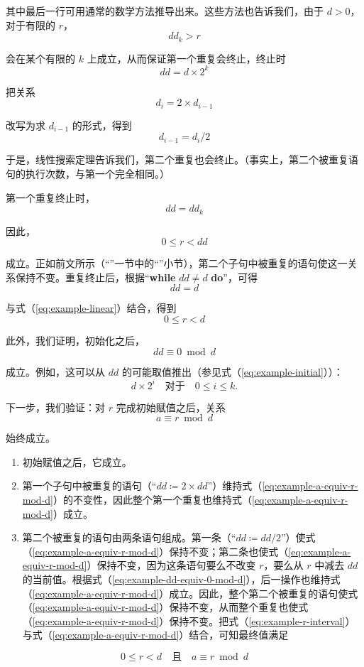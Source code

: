 \noindent
其中最后一行可用通常的数学方法推导出来。这些方法也告诉我们，由于 $d > 0$，对于有限的 $r$，
$$
dd_k > r
$$

\noindent
会在某个有限的 $k$ 上成立，从而保证第一个重复会终止，终止时
$$
dd = d\times 2^k
$$

把关系
$$
d_i = 2\times d_{i-1}
$$

\noindent
改写为求 $d_{i-1}$ 的形式，得到
$$
d_{i-1} = d_i/2
$$

\noindent
于是，线性搜索定理告诉我们，第二个重复也会终止。（事实上，第二个被重复语句的执行次数，与第一个完全相同。）

第一个重复终止时，
$$
dd=dd_k
$$

\noindent
因此，
\begin{equation}
	\label{eq:example-linear}
	0 \leqslant r <dd
\end{equation}

\noindent
成立。正如前文所示（“”一节中的“”小节），第二个子句中被重复的语句使这一关系保持不变。重复终止后，根据“\textbf{while} $dd \neq d$ \textbf{do}”，可得
$$
dd = d
$$

\noindent
与式（\ref{eq:example-linear}）结合，得到
\begin{equation}
	\label{eq:example-r-interval}
	0 \leqslant r < d
\end{equation}

此外，我们证明，初始化之后，
\begin{equation}
	\label{eq:example-dd-equiv-0-mod-d}
	dd \equiv 0 \bmod d
\end{equation}

\noindent
成立。例如，这可以从 $dd$ 的可能取值推出（参见式（\ref{eq:example-initial}））：
$$
d\times 2^i\quad \text{对于}\quad 0 \leqslant i \leqslant k.
$$

下一步，我们验证：对 $r$ 完成初始赋值之后，关系
\begin{equation}
	\label{eq:example-a-equiv-r-mod-d}
	a \equiv r \bmod d
\end{equation}

\noindent
始终成立。

\begin{enumerate}[wide, nosep, label=(\arabic*)]
	\item 初始赋值之后，它成立。
	\item 第一个子句中被重复的语句（“$dd \coloneq 2\times dd$”）维持式（\ref{eq:example-a-equiv-r-mod-d}）的不变性，因此整个第一个重复也维持式（\ref{eq:example-a-equiv-r-mod-d}）成立。
	\item 第二个被重复的语句由两条语句组成。第一条（“$dd \coloneq dd/2$”）使式（\ref{eq:example-a-equiv-r-mod-d}）保持不变；第二条也使式（\ref{eq:example-a-equiv-r-mod-d}）保持不变，因为这条语句要么不改变 $r$，要么从 $r$ 中减去 $dd$ 的当前值。根据式（\ref{eq:example-dd-equiv-0-mod-d}），后一操作也维持式（\ref{eq:example-a-equiv-r-mod-d}）成立。因此，整个第二个被重复的语句使式（\ref{eq:example-a-equiv-r-mod-d}）保持不变，从而整个重复也使式（\ref{eq:example-a-equiv-r-mod-d}）保持不变。把式（\ref{eq:example-r-interval}）与式（\ref{eq:example-a-equiv-r-mod-d}）结合，可知最终值满足
\end{enumerate}
\medskip
$$
0 \leqslant r < d\quad \text{且}\quad a \equiv r \bmod d
$$

